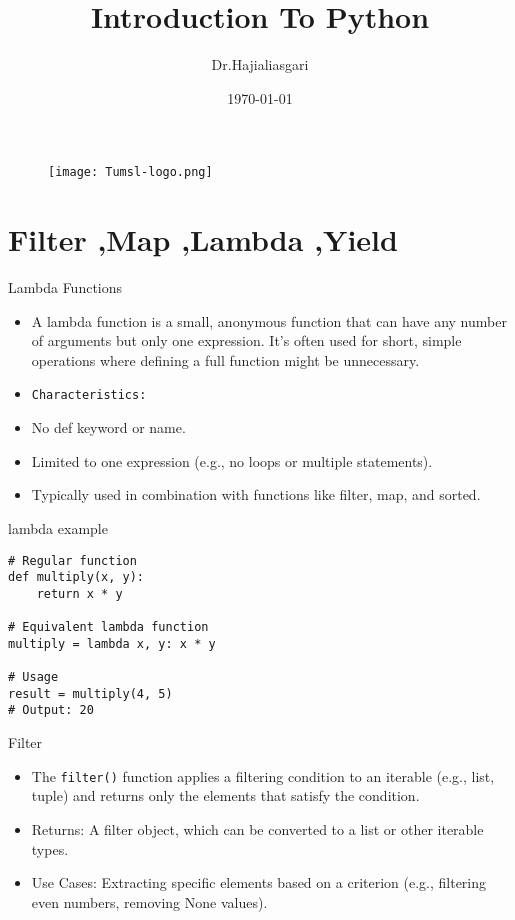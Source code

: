 \documentclass[serif, aspectratio=169]{beamer}
\author{Dr.Hajialiasgari}
\title{Introduction To Python}
\institute{
    Tehran University \\
    Of\\
    Medical Science
}
\date{\small \today}
\begin{document}
\begin{frame}
    \titlepage
    \vspace*{-0.6cm}
    \begin{figure}[htpb]
        \begin{center}
            \texttt{[image: Tumsl-logo.png]}
        \end{center}
    \end{figure}
\end{frame}

\begin{frame}    
\tableofcontents[sectionstyle=show, subsectionstyle=show/shaded/hide, subsubsectionstyle=show/shaded/hide]
\end{frame}

\section{Filter ,Map ,Lambda ,Yield}

\begin{frame}{Lambda Functions}
    \begin{itemize}
        \item A lambda function is a small, anonymous function that can have any number of arguments but only one expression. It's often used for short, simple operations where defining a full function might be unnecessary.
        \item \texttt{\color{red}Characteristics:}
        \item No def keyword or name.
        \item Limited to one expression (e.g., no loops or multiple statements).
        \item Typically used in combination with functions like filter, map, and sorted.
    \end{itemize}
\end{frame}

\begin{frame}[fragile]{lambda example}
    \begin{lstlisting}
# Regular function
def multiply(x, y):
    return x * y

# Equivalent lambda function
multiply = lambda x, y: x * y

# Usage
result = multiply(4, 5) 
# Output: 20
   \end{lstlisting}
\end{frame}

\begin{frame}{Filter}
    \begin{itemize}
        \item The \texttt{\color{red}filter()} function applies a filtering condition to an iterable (e.g., list, tuple) and returns only the elements that satisfy the condition.
        \item Returns: A filter object, which can be converted to a list or other iterable types.
        \item Use Cases: Extracting specific elements based on a criterion (e.g., filtering even numbers, removing None values).
    \end{itemize}
\end{frame}
\end{document}
